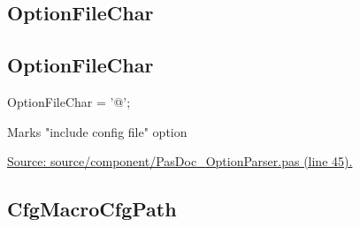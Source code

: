\documentclass{report}
\newif\ifpdf
\begin{document}
\subsection*{\large{\textbf{OptionFileChar}}\normalsize\hspace{1ex}\hrulefill}
\else
\subsection*{OptionFileChar}
\fi
\label{PasDoc_OptionParser-OptionFileChar}
\begin{list}{}{
\setlength{\itemindent}{0cm}
\setlength{\listparindent}{0cm}
\setlength{\leftmargin}{\evensidemargin}
\addtolength{\leftmargin}{\tmplength}
\settowidth{\labelsep}{X}
\addtolength{\leftmargin}{\labelsep}
\setlength{\labelwidth}{\tmplength}
}
\item[\textbf{Declaration}\hfill]
\ifpdf
\begin{flushleft}
\fi
\begin{ttfamily}
OptionFileChar = '@';\end{ttfamily}

\ifpdf
\end{flushleft}
\fi

\par
\item[\textbf{Description}]
Marks "include config file" option\par
\href{https://github.com/pasdoc/pasdoc/blob/master/source/component/PasDoc_OptionParser.pas#L45}{Source: source/component/PasDoc{\_}OptionParser.pas (line 45).}

\end{list}
\ifpdf
\subsection*{\large{\textbf{CfgMacroCfgPath}}\normalsize\hspace{1ex}\hrulefill}
\else
\end{document}
